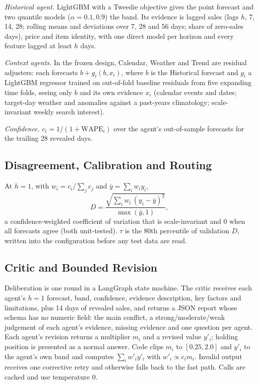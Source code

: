 \documentclass[conference]{IEEEtran}
\begin{document}
\emph{Historical agent.} LightGBM with a Tweedie objective gives the point forecast and two quantile
models ($\alpha=0.1, 0.9$) the band. Its evidence is lagged sales (lags $h$, 7, 14, 28; rolling
means and deviations over 7, 28 and 56 days; share of zero-sales days), price and item identity,
with one direct model per horizon and every feature lagged at least $h$ days.

\emph{Context agents.} In the frozen design, Calendar, Weather and Trend are residual adjusters:
each forecasts $b+g_i(b,x_i)$, where $b$ is the Historical forecast and $g_i$ a LightGBM regressor
trained on out-of-fold baseline residuals from five expanding time folds, seeing only $b$ and its
own evidence $x_i$ (calendar events and dates; target-day weather and anomalies against a
past-years climatology; scale-invariant weekly search interest).

\emph{Confidence.} $c_i=1/(1+\mathrm{WAPE}_i)$ over the agent's out-of-sample forecasts for the
trailing 28 revealed days.

\subsection{Disagreement, Calibration and Routing}
At $h=1$, with $w_i=c_i/\sum_j c_j$ and $\bar y=\sum_i w_i y_i$,
\begin{equation}
D=\frac{\sqrt{\sum_i w_i\,(y_i-\bar y)^2}}{\max(\bar y,1)},
\end{equation}
a confidence-weighted coefficient of variation that is scale-invariant and 0 when all forecasts
agree (both unit-tested). $\tau$ is the 80th percentile of validation $D$, written into the
configuration before any test data are read.

\subsection{Critic and Bounded Revision}
Deliberation is one round in a LangGraph state machine. The critic receives each agent's $h=1$
forecast, band, confidence, evidence description, key factors and limitations, plus 14 days of
revealed sales, and returns a JSON report whose schema has no numeric field: the main conflict, a
strong/moderate/weak judgement of each agent's evidence, missing evidence and one question per
agent. Each agent's revision returns a multiplier $m_i$ and a revised value $y'_i$; holding position
is presented as a normal answer. Code clips $m_i$ to $[0.25,2.0]$ and $y'_i$ to the agent's own band
and computes $\sum_i w'_i y'_i$ with $w'_i\propto c_i m_i$. Invalid output receives one corrective
retry and otherwise falls back to the fast path. Calls are cached and use temperature 0.
\end{document}
